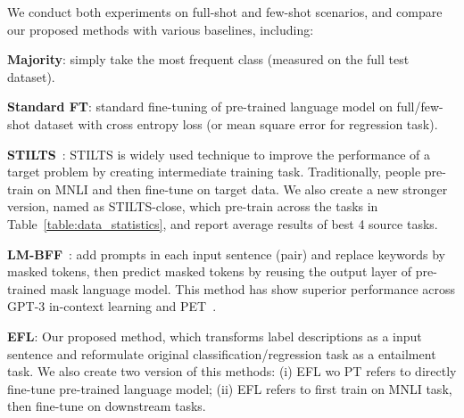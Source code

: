 \documentclass{article}
\begin{document}
We conduct both experiments on full-shot and few-shot scenarios, and compare our proposed methods with various baselines, including: 

\textbf{Majority}: simply take the most frequent class (measured on the full test dataset).

\textbf{Standard FT}: standard fine-tuning of pre-trained language model on full/few-shot dataset with cross entropy loss (or mean square error for regression task).

\textbf{STILTS}~\citep{phang2018sentence}: STILTS is widely used
technique to improve the performance of a target problem by creating intermediate training task. Traditionally, people pre-train  on MNLI and then fine-tune on target data. We also create a new stronger version, named as STILTS-close, which pre-train  across the tasks in Table~\ref{table:data_statistics}, and report average results of best 4 source tasks.

\textbf{LM-BFF}~\citep{gao2020making}: add prompts in each input sentence (pair) and replace keywords by masked tokens, then predict masked tokens by reusing the output layer of pre-trained mask language model. This method has show superior performance across GPT-3 in-context learning and PET~\citep{schick2020exploiting}.

\textbf{EFL}: Our proposed method, which transforms label descriptions as a input sentence and reformulate original classification/regression task as a entailment task. We also create two version of this methods: (i) EFL wo PT refers to directly fine-tune pre-trained language model; (ii) EFL refers to first train on MNLI task, then fine-tune on downstream tasks.
\end{document}
